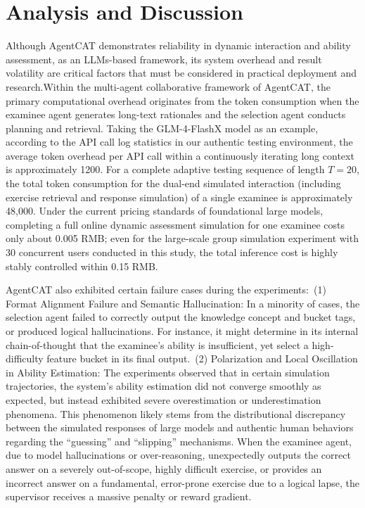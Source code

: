 
\section{Analysis and Discussion}
Although AgentCAT demonstrates reliability in dynamic interaction and ability assessment, as an LLMs-based framework, its system overhead and result volatility are critical factors that must be considered in practical deployment and research.Within the multi-agent collaborative framework of AgentCAT, the primary computational overhead originates from the token consumption when the examinee agent generates long-text rationales and the selection agent conducts planning and retrieval. Taking the GLM-4-FlashX model as an example, according to the API call log statistics in our authentic testing environment, the average token overhead per API call within a continuously iterating long context is approximately 1200. For a complete adaptive testing sequence of length $T=20$, the total token consumption for the dual-end simulated interaction (including exercise retrieval and response simulation) of a single examinee is approximately 48,000. Under the current pricing standards of foundational large models, completing a full online dynamic assessment simulation for one examinee costs only about 0.005 RMB; even for the large-scale group simulation experiment with 30 concurrent users conducted in this study, the total inference cost is highly stably controlled within 0.15 RMB.

AgentCAT also exhibited certain failure cases during the experiments:~(1) Format Alignment Failure and Semantic Hallucination: In a minority of cases, the selection agent failed to correctly output the knowledge concept and bucket tags, or produced logical hallucinations. For instance, it might determine in its internal chain-of-thought that the examinee's ability is insufficient, yet select a high-difficulty feature bucket in its final output.~(2) Polarization and Local Oscillation in Ability Estimation: The experiments observed that in certain simulation trajectories, the system's ability estimation did not converge smoothly as expected, but instead exhibited severe overestimation or underestimation phenomena. This phenomenon likely stems from the distributional discrepancy between the simulated responses of large models and authentic human behaviors regarding the ``guessing'' and    ``slipping'' mechanisms. When the examinee agent, due to model hallucinations or over-reasoning, unexpectedly outputs the correct answer on a severely out-of-scope, highly difficult exercise, or provides an incorrect answer on a fundamental, error-prone exercise due to a logical lapse, the supervisor receives a massive penalty or reward gradient.

